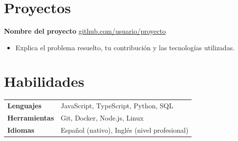 \documentclass[11pt,a4paper]{article}
\begin{document}
\section{Proyectos}

\textbf{Nombre del proyecto} \hfill
\href{https://github.com/usuario/proyecto}{github.com/usuario/proyecto}
\begin{itemize}
  \item Explica el problema resuelto, tu contribución y las tecnologías utilizadas.
\end{itemize}

\section{Habilidades}

\begin{tabularx}{\linewidth}{@{}>{\bfseries}l X@{}}
  Lenguajes    & JavaScript, TypeScript, Python, SQL \\
  Herramientas & Git, Docker, Node.js, Linux \\
  Idiomas      & Español (nativo), Inglés (nivel profesional)
\end{tabularx}
\end{document}
